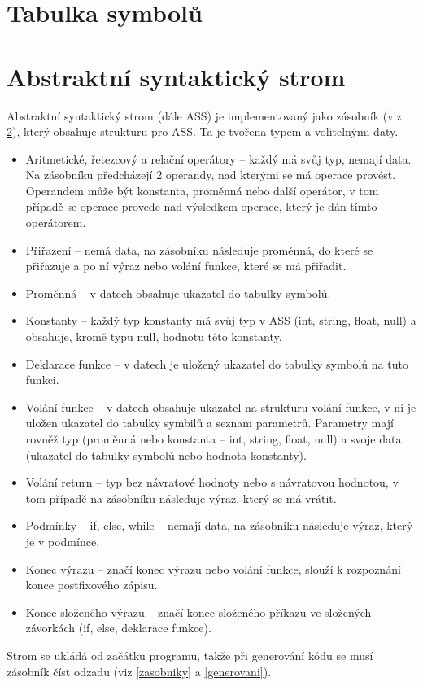 \documentclass[a4paper, 12pt]{article}
\begin{document}
    \section{Tabulka symbolů}

    \section{Abstraktní syntaktický strom}
    Abstraktní syntaktický strom (dále ASS) je implementovaný jako zásobník (viz \ref{}), který obsahuje strukturu pro ASS. Ta je tvořena typem a volitelnými daty.
    \begin{itemize}
        \item Aritmetické, řetezcový a relační operátory -- každý má svůj typ, nemají data. Na zásobníku předcházejí 2 operandy, nad kterými se má operace provést. Operandem může být konstanta, proměnná nebo další operátor, v tom případě se operace provede nad výsledkem operace, který je dán tímto operátorem.
        \item Přiřazení -- nemá data, na zásobníku následuje proměnná, do které se přiřazuje a po ní výraz nebo volání funkce, které se má přiřadit.
        \item Proměnná -- v datech obsahuje ukazatel do tabulky symbolů.
        \item Konstanty -- každý typ konstanty má svůj typ v ASS (int, string, float, null) a obsahuje, kromě typu null, hodnotu této konstanty.
        \item Deklarace funkce -- v datech je uložený ukazatel do tabulky symbolů na tuto funkci.
        \item Volání funkce -- v datech obsahuje ukazatel na strukturu volání funkce, v ní je uložen ukazatel do tabulky symbilů a seznam parametrů. Parametry mají rovněž typ (proměnná nebo konstanta -- int, string, float, null) a svoje data (ukazatel do tabulky symbolů nebo hodnota konstanty).
        \item Volání return -- typ bez návratové hodnoty nebo s návratovou hodnotou, v tom případě na zásobníku následuje výraz, který se má vrátit.
        \item Podmínky -- if, else, while -- nemají data, na zásobníku následuje výraz, který je v podmínce.
        \item Konec výrazu -- značí konec výrazu nebo volání funkce, slouží k rozpoznání konce postfixového zápisu.
        \item Konec složeného výrazu -- značí konec složeného příkazu ve složených závorkách (if, else, deklarace funkce).
    \end{itemize}
    Strom se ukládá od začátku programu, takže při generování kódu se musí zásobník číst odzadu (viz \ref{zasobniky} a \ref{generovani}).
\end{document}
